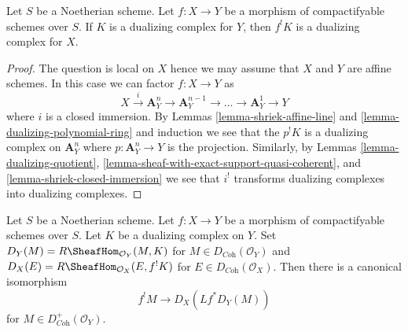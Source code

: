 \begin{lemma}
\label{lemma-shriek-dualizing}
Let $S$ be a Noetherian scheme. Let $f : X \to Y$ be a morphism
of compactifyable schemes over $S$. If $K$ is a dualizing complex
for $Y$, then $f^!K$ is a dualizing complex for $X$.
\end{lemma}

\begin{proof}
The question is local on $X$ hence we may assume that $X$ and $Y$ are
affine schemes. In this case we can factor $f : X \to Y$ as
$$
X \xrightarrow{i} \mathbf{A}^n_Y \to \mathbf{A}^{n - 1}_Y \to \ldots \to
\mathbf{A}^1_Y \to Y
$$
where $i$ is a closed immersion. By Lemmas \ref{lemma-shriek-affine-line} and
\ref{lemma-dualizing-polynomial-ring} and induction we see that
the $p^!K$ is a dualizing complex on $\mathbf{A}^n_Y$ where
$p : \mathbf{A}^n_Y \to Y$ is the projection. Similarly, by
Lemmas \ref{lemma-dualizing-quotient},
\ref{lemma-sheaf-with-exact-support-quasi-coherent}, and
\ref{lemma-shriek-closed-immersion} we see that $i^!$
transforms dualizing complexes into dualizing complexes.
\end{proof}

\begin{lemma}
\label{lemma-shriek-via-duality}
Let $S$ be a Noetherian scheme. Let $f : X \to Y$ be a morphism
of compactifyable schemes over $S$. Let $K$ be a dualizing complex
on $Y$. Set $D_Y(M) = R\SheafHom_{\mathcal{O}_Y}(M, K)$ for
$M \in D_{\textit{Coh}}(\mathcal{O}_Y)$ and
$D_X(E) = R\SheafHom_{\mathcal{O}_X}(E, f^!K)$ for
$E \in D_{\textit{Coh}}(\mathcal{O}_X)$. Then there is a canonical
isomorphism
$$
f^!M \longrightarrow D_X(Lf^*D_Y(M))
$$
for $M \in D_{\textit{Coh}}^+(\mathcal{O}_Y)$.
\end{lemma}

